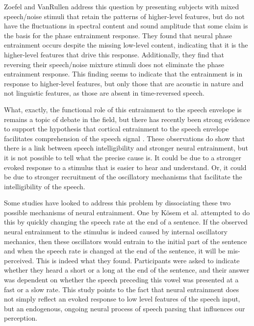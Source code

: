 \documentclass[titlepage]{article}
\begin{document}
    Zoefel and VanRullen \cite{Zoefel2016} address this question by presenting
    subjects with mixed speech/noise stimuli that retain the patterns of
    higher-level features, but do not have the fluctuations in spectral content
    and sound amplitude that some claim is the basis for the phase entrainment
    response. They found that neural phase entrainment occurs despite the
    missing low-level content, indicating that it is the higher-level features
    that drive this response. Additionally, they find that reversing their
    speech/noise mixture stimuli does not eliminate the phase entrainment
    response. This finding seems to indicate that the entrainment is in
    response to higher-level features, but only those that are acoustic in
    nature and not linguistic features, as those are absent in time-reversed
    speech.

    What, exactly, the functional role of this entrainment to the speech
    envelope is remains a topic of debate in the field, but there has recently
    been strong evidence to support the hypothesis that cortical entrainment to
    the speech envelope facilitates comprehension of the speech signal
    \cite{Ding2014a,Ding2012,OSullivan2015}. These observations do show that 
    there is a link between speech intelligibility and stronger neural 
    entrainment, but it is not possible to tell what the precise cause is. It 
    could be due to a stronger evoked response to a stimulus that is easier to 
    hear and understand. Or, it could be due to stronger recruitment of the 
    oscillatory mechanisms that facilitate the intelligibility of the speech.

    Some studies have looked to address this problem by dissociating these 
    two possible mechanisms of neural entrainment. One by K{\"o}sem et al.
    \cite{Kosem2017} attempted to do this by quickly changing the speech 
    rate at the end of a sentence. If the observed neural entrainment to the 
    stimulus is indeed caused by internal oscillatory mechanics, then these 
    oscillators would entrain to the initial part of the sentence and when the 
    speech rate is changed at the end of the sentence, it will be mis-perceived.
    This is indeed what they found. Participants were asked to indicate whether 
    they heard a short \textipa{[A]} or a long \textipa{[a:]} at the end of the 
    sentence, and their answer was dependent on whether the speech preceding 
    this vowel was presented at a fast or a slow rate. This study points to the 
    fact that neural entrainment does not simply reflect an evoked response 
    to low level features of the speech input, but an endogenous, ongoing 
    neural process of speech parsing that influences our perception. 
\end{document}
